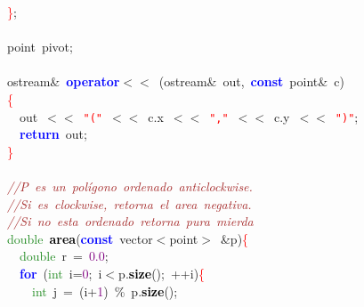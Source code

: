 \documentclass[10pt,a4paper,twoside]{article}
\begin{document}
{{{{{{{{{{\mbox{}\textcolor{Red}{\}}\textcolor{BrickRed}{;} \\
\mbox{} \\
\mbox{}point\ pivot\textcolor{BrickRed}{;} \\
\mbox{} \\
\mbox{}ostream\textcolor{BrickRed}{\&}\ \textbf{\textcolor{Blue}{operator}}\textcolor{BrickRed}{$<<$}\ \textcolor{BrickRed}{(}ostream\textcolor{BrickRed}{\&}\ out\textcolor{BrickRed}{,}\ \textbf{\textcolor{Blue}{const}}\ point\textcolor{BrickRed}{\&}\ c\textcolor{BrickRed}{)} \\
\mbox{}\textcolor{Red}{\{} \\
\mbox{}\ \ out\ \textcolor{BrickRed}{$<<$}\ \texttt{\textcolor{Red}{"{}("{}}}\ \textcolor{BrickRed}{$<<$}\ c\textcolor{BrickRed}{.}x\ \textcolor{BrickRed}{$<<$}\ \texttt{\textcolor{Red}{"{},"{}}}\ \textcolor{BrickRed}{$<<$}\ c\textcolor{BrickRed}{.}y\ \textcolor{BrickRed}{$<<$}\ \texttt{\textcolor{Red}{"{})"{}}}\textcolor{BrickRed}{;} \\
\mbox{}\ \ \textbf{\textcolor{Blue}{return}}\ out\textcolor{BrickRed}{;} \\
\mbox{}\textcolor{Red}{\}} \\
\mbox{} \\
\mbox{}\textit{\textcolor{Brown}{//P\ es\ un\ polígono\ ordenado\ anticlockwise.}} \\
\mbox{}\textit{\textcolor{Brown}{//Si\ es\ clockwise,\ retorna\ el\ area\ negativa.}} \\
\mbox{}\textit{\textcolor{Brown}{//Si\ no\ esta\ ordenado\ retorna\ pura\ mierda}} \\
\mbox{}\textcolor{ForestGreen}{double}\ \textbf{\textcolor{Black}{area}}\textcolor{BrickRed}{(}\textbf{\textcolor{Blue}{const}}\ vector\textcolor{BrickRed}{$<$}point\textcolor{BrickRed}{$>$}\ \textcolor{BrickRed}{\&}p\textcolor{BrickRed}{)}\textcolor{Red}{\{} \\
\mbox{}\ \ \textcolor{ForestGreen}{double}\ r\ \textcolor{BrickRed}{=}\ \textcolor{Purple}{0.0}\textcolor{BrickRed}{;} \\
\mbox{}\ \ \textbf{\textcolor{Blue}{for}}\ \textcolor{BrickRed}{(}\textcolor{ForestGreen}{int}\ i\textcolor{BrickRed}{=}\textcolor{Purple}{0}\textcolor{BrickRed}{;}\ i\textcolor{BrickRed}{$<$}p\textcolor{BrickRed}{.}\textbf{\textcolor{Black}{size}}\textcolor{BrickRed}{();}\ \textcolor{BrickRed}{++}i\textcolor{BrickRed}{)}\textcolor{Red}{\{} \\
\mbox{}\ \ \ \ \textcolor{ForestGreen}{int}\ j\ \textcolor{BrickRed}{=}\ \textcolor{BrickRed}{(}i\textcolor{BrickRed}{+}\textcolor{Purple}{1}\textcolor{BrickRed}{)}\ \textcolor{BrickRed}{\%}\ p\textcolor{BrickRed}{.}\textbf{\textcolor{Black}{size}}\textcolor{BrickRed}{();} \\
}}}}}}}}}}
\end{document}

